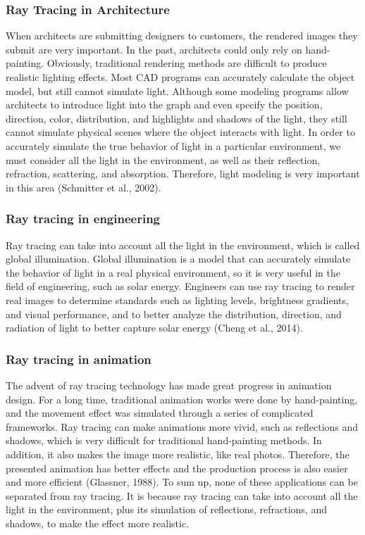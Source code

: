 \documentclass[11pt]{article}
\begin{document}
\subsubsection{Ray Tracing in Architecture}
When architects are submitting designers to customers, the rendered images they submit are very important. In the past, architects could only rely on hand-painting. Obviously, traditional rendering methods are difficult to produce realistic lighting effects. Most CAD programs can accurately calculate the object model, but still cannot simulate light. Although some modeling programs allow architects to introduce light into the graph and even specify the position, direction, color, distribution, and highlights and shadows of the light, they still cannot simulate physical scenes where the object interacts with light. In order to accurately simulate the true behavior of light in a particular environment, we must consider all the light in the environment, as well as their reflection, refraction, scattering, and absorption. Therefore, light modeling is very important in this area (Schmitter et al., 2002).

\subsubsection{Ray tracing in engineering}
Ray tracing can take into account all the light in the environment, which is called global illumination. Global illumination is a model that can accurately simulate the behavior of light in a real physical environment, so it is very useful in the field of engineering, such as solar energy. Engineers can use ray tracing to render real images to determine standards such as lighting levels, brightness gradients, and visual performance, and to better analyze the distribution, direction, and radiation of light to better capture solar energy (Cheng et al., 2014).

\subsubsection{Ray tracing in animation}
The advent of ray tracing technology has made great progress in animation design. For a long time, traditional animation works were done by hand-painting, and the movement effect was simulated through a series of complicated frameworks. Ray tracing can make animations more vivid, such as reflections and shadows, which is very difficult for traditional hand-painting methods. In addition, it also makes the image more realistic, like real photos. Therefore, the presented animation has better effects and the production process is also easier and more efficient (Glassner, 1988).
To sum up, none of these applications can be separated from ray tracing. It is because ray tracing can take into account all the light in the environment, plus its simulation of reflections, refractions, and shadows, to make the effect more realistic.
\end{document}
